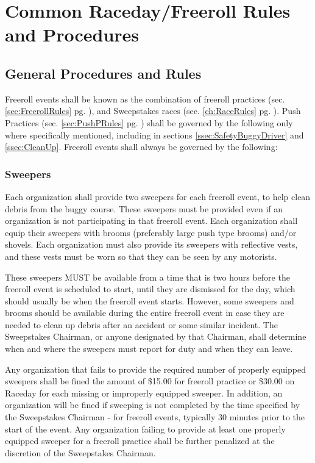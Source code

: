 \chapter{Common Raceday/Freeroll Rules and Procedures}
\label{ch:CommonRules}

\section{General Procedures and Rules}
	Freeroll events shall be known as the combination of freeroll practices
	(sec. \ref{sec:FreerollRules} pg. \pageref{sec:FreerollRules}), and Sweepstakes races
	(sec. \ref{ch:RaceRules} pg. \pageref{ch:RaceRules}). Push Practices
	(sec. \ref{sec:PushPRules} pg. \pageref{sec:PushPRules}) shall
	be governed by the following only where specifically mentioned, including
	in sections \ref{ssec:SafetyBuggyDriver} and \ref{ssec:CleanUp}. Freeroll
	events shall always be governed by the following:

\subsection{Sweepers}
\label{subsec:Sweepers}

	Each organization shall provide two sweepers for each freeroll event, to
	help clean debris from the buggy course. These sweepers must be provided even
	if an organization is not participating in that freeroll event. Each
	organization shall equip their sweepers with brooms (preferably large push type
	brooms) and/or shovels. Each organization must also provide its sweepers
    with reflective vests, and these vests must be worn so that they
	can be seen by any motorists.

	These sweepers MUST be available from a time that is two hours before the
	freeroll event is scheduled to start, until they are dismissed for the day,
	which should usually be when the freeroll event starts. However, some
	sweepers and brooms should be available during the entire freeroll event in
	case they are needed to clean up debris after an accident or some similar
	incident. The Sweepstakes Chairman, or anyone designated by that Chairman,
	shall determine when and where the sweepers must report for duty and when they
	can leave.

	Any organization that fails to provide the required number of properly
	equipped sweepers shall be fined the amount of \$15.00 for freeroll practice or
	\$30.00 on Raceday for each missing or improperly equipped sweeper. In addition,
    an organization will be fined if sweeping is not completed by the time specified
    by the Sweepstakes Chairman - for freeroll events, typically 30 minutes prior
    to the start of the event. Any organization failing to provide at least one
    properly equipped sweeper for a freeroll practice shall be further penalized
    at the discretion of the Sweepstakes Chairman.

